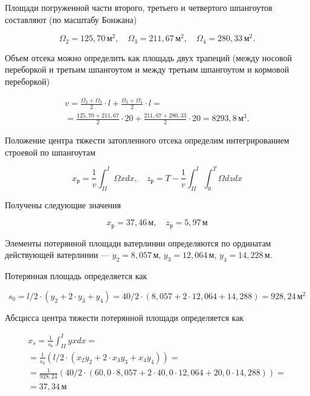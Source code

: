 Площади погруженной части второго, третьего и четвертого шпангоутов составляют (по масштабу Бонжана)

\begin{equation*}
    \Omega_2 = 125{,}70\,\text{м}^2, \quad \Omega_3 = 211{,}67\,\text{м}^2, \quad \Omega_4 = 280{,}33\,\text{м}^2.
\end{equation*}

Объем отсека можно определить как площадь двух трапеций (между носовой переборкой и третьим шпангоутом и между третьим шпангоутом и кормовой переборкой)

\begin{equation*}
    \begin{split}
    v = \frac{\Omega_2 + \Omega_3}{2} \cdot l + \frac{\Omega_3+\Omega_4}{2} \cdot l = \\
    = \frac{125{,}70 + 211{,}67}{2} \cdot 20 + \frac{211{,}67 + 280{,}33}{2} \cdot 20 = 8293{,}8\,\text{м}^3.
    \end{split}
\end{equation*}

Положение центра тяжести затопленного отсека определим интегрированием строевой по шпангоутам

\begin{equation*}
    x_{\text{р}} = \frac{1}{v} \int_{II}^{I} \Omega x dx , \quad
    z_{\text{р}} = T - \frac{1}{v} \int_{II}^{I} \int_0^T \Omega dz dx
\end{equation*}

Получены следующие значения

\begin{equation*}
    x_{\text{р}} = 37{,}46\,\text{м} , \quad
    z_{\text{р}} = 5{,}97 \,\text{м}
\end{equation*}

Элементы потерянной площади ватерлинии определяются по ординатам действующей ватерлинии --- $y_2 = 8{,}057\,\text{м}$, $y_3 = 12{,}064\,\text{м}$, $y_4 = 14{,}228\,\text{м}$.

Потерянная площадь определяется как

\begin{equation*}
    s_0 = l/2 \cdot (y_2 + 2 \cdot y_3 + y_4) = 40 / 2 \cdot (8{,}057 + 2 \cdot 12{,}064 + 14{,}288) = 928{,}24\,\text{м}^2
\end{equation*}

Абсцисса центра тяжести потерянной площади определяется как

\begin{equation*}
    \begin{split}
    x_s = \frac{1}{s_0} \int_{II}^{I} y x dx = \\
    = \frac{1}{s_0} (l/2 \cdot(x_2 y_2 + 2 \cdot x_3  y_3 + x_4 y_4)) = \\
    = \frac{1}{928{,}24} (40/2 \cdot(60{,}0 \cdot 8{,}057 + 2 \cdot 40{,}0 \cdot 12{,}064 + 20{,}0 \cdot 14{,}288)) = \\
    = 37{,}34\,\text{м}
    \end{split}
\end{equation*}

